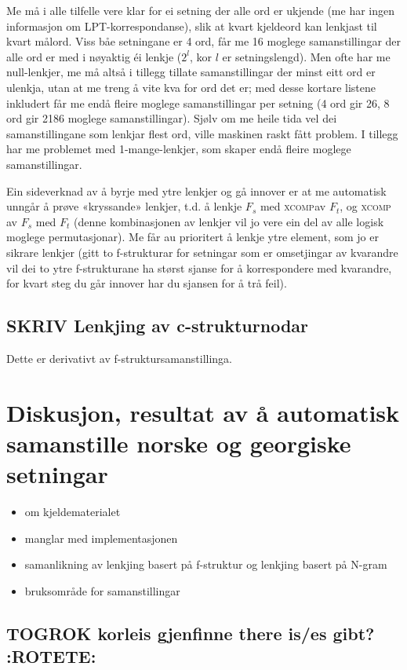 \documentclass[11pt,a4paper,oneside,draft]{book}
\newcommand{\F}[2]{\textsc{#1}\ensuremath{_{#2}}}
\newcommand{\XCOMP}{\F{xcomp}{}}
\begin{document}
Me må i alle tilfelle vere klar for ei setning der alle ord er ukjende
(me har ingen informasjon om LPT-korrespondanse), slik at kvart
kjeldeord kan lenkjast til kvart målord. Viss båe setningane er 4 ord,
får me 16 moglege samanstillingar der alle ord er med i nøyaktig éi
lenkje ($2^l$, kor $l$ er setningslengd). Men ofte har me
null-lenkjer, me må altså i tillegg tillate samanstillingar der minst
eitt ord er ulenkja, utan at me treng å vite kva for ord det er; med
desse kortare listene inkludert får me endå fleire moglege
samanstillingar per setning (4 ord gir 26, 8 ord gir 2186 moglege
samanstillingar). Sjølv om me heile tida vel dei samanstillingane som
lenkjar flest ord, ville maskinen raskt fått problem. I tillegg har me
problemet med 1-mange-lenkjer, som skaper endå fleire moglege
samanstillingar.

Ein sideverknad av å byrje med ytre lenkjer og gå innover er at me
automatisk unngår å prøve «kryssande» lenkjer, t.d. å lenkje $F_s$ med
\XCOMP av $F_t$, og \XCOMP av $F_s$ med $F_t$ (denne kombinasjonen av
lenkjer vil jo vere ein del av alle logisk moglege permutasjonar). Me
får au prioritert å lenkje ytre element, som jo er sikrare lenkjer
(gitt to f-strukturar for setningar som er omsetjingar av kvarandre
vil dei to ytre f-strukturane ha størst sjanse for å korrespondere med
kvarandre, for kvart steg du går innover har du sjansen for å trå
feil).

\section{\textbf{SKRIV} Lenkjing av c-strukturnodar}
\label{sec-4.4}

Dette er derivativt av f-struktursamanstillinga.
\chapter{Diskusjon, resultat av å automatisk samanstille norske og georgiske setningar}
\label{sec-5}

\begin{itemize}
\item om kjeldematerialet
\item manglar med implementasjonen
\item samanlikning av lenkjing basert på f-struktur og lenkjing basert
     på N-gram
\item bruksområde for samanstillingar
\end{itemize}
\section{\textbf{TOGROK} korleis gjenfinne there is/es gibt? \textbf{:ROTETE:}}
\label{sec-5.1}
\end{document}
